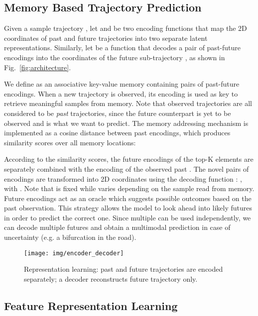 \documentclass[10pt,twocolumn,letterpaper]{article}
\begin{document}
\subsection{Memory Based Trajectory Prediction}

Given a sample trajectory , let  and  be two encoding functions that map the 2D coordinates of past and future trajectories into two separate latent representations. Similarly, let  be a function that decodes a pair of past-future encodings into the coordinates of the future sub-trajectory , as shown in Fig.~\ref{fig:architecture}.

We define  as an associative key-value memory containing  pairs of past-future encodings.
When a new trajectory  is observed, its encoding  is used as key to retrieve meaningful samples from memory. Note that observed trajectories are all considered to be \textit{past} trajectories, since the future counterpart is yet to be observed and is what we want to predict.
The memory addressing mechanism is implemented as a cosine distance between past encodings, which produces similarity scores  over all memory locations:



According to the similarity scores, the future encodings of the top-K elements  are separately combined with the encoding of the observed past . The novel pairs of encodings are transformed into 2D coordinates using the decoding function : , with .
Note that  is fixed while  varies depending on the sample read from memory.
Future encodings  act as an oracle which suggests possible outcomes based on the past observation. This strategy allows the model to look ahead into likely futures in order to predict the correct one.
Since multiple  can be used independently, we can decode multiple futures and obtain a multimodal prediction in case of uncertainty (e.g. a bifurcation in the road). 


\begin{figure}[t]
	\centering
	\texttt{[image: img/encoder\_decoder]}
	\caption{Representation learning: past and future trajectories are encoded separately; a decoder reconstructs future trajectory only.\label{fig:enc_dec}}
	\vspace{-10pt}
\end{figure}	


\subsection{Feature Representation Learning}
\end{document}
